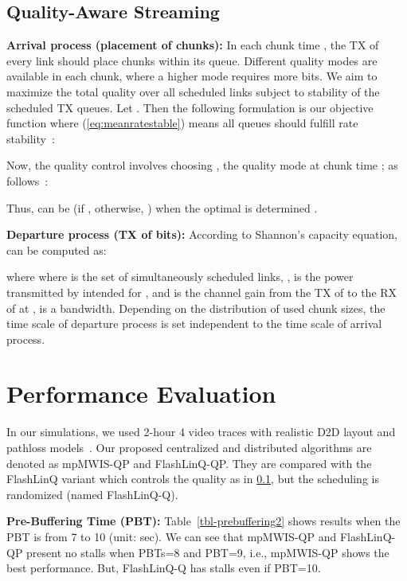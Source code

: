 \documentclass[journal]{IEEEtran}
\begin{document}
 \vspace{-2.5mm}
\subsection{Quality-Aware Streaming}\label{sec:streaming}

\textbf{Arrival process (placement of chunks):}
In each chunk time , the TX of every link should place chunks within its queue. Different quality modes are available in each chunk, where a higher mode requires more bits.
We aim to maximize the total quality over all scheduled links subject to stability of the scheduled TX queues.
Let .
Then the following formulation is our objective function where (\ref{eq:meanratestable}) means all queues should fulfill rate stability~\cite{asilomar2012bethanabhotla}:


Now, the quality control involves choosing , the quality mode at chunk time ; as follows~\cite{asilomar2012bethanabhotla}:


Thus,
 can be  (if , otherwise, ) when the optimal  is determined .


\textbf{Departure process (TX of bits):}
According to Shannon's capacity equation,  can be computed as:

where  where  is the set of simultaneously scheduled links, ,
 is the power transmitted by  intended for , and  is the channel gain from the TX of  to the RX of  at ,
 is a bandwidth.
Depending on the distribution of used chunk sizes, the time scale of departure process is set independent to the time scale of arrival process.

\vspace{-1.0mm}
\section{Performance Evaluation}\label{sec:simulation}
In our simulations, we used 2-hour 4 video traces with realistic D2D layout and pathloss models~\cite{jsac2014ji}.
Our proposed centralized and distributed algorithms are denoted as mpMWIS-QP and FlashLinQ-QP.
They are compared with the FlashLinQ variant which controls the quality as in \textsection\ref{sec:streaming}, but the scheduling is randomized (named FlashLinQ-Q).

\textbf{Pre-Buffering Time (PBT):}
Table~\ref{tbl-prebuffering2} shows results when the PBT is from 7 to 10 (unit: sec).
We can see that mpMWIS-QP and FlashLinQ-QP present no stalls when PBTs=8 and PBT=9, i.e., mpMWIS-QP shows the best performance.
But, FlashLinQ-Q has stalls even if PBT=10.
\end{document}
